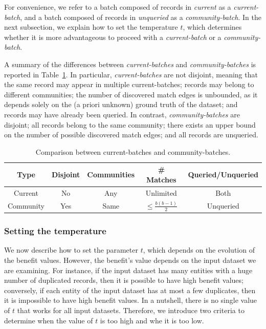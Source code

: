\documentclass[sigconf, nonacm]{acmart}
\newcommand{\window}{b}
\begin{document}
For convenience, we refer to a batch composed of records in \emph{current} as a \emph{current-batch}, and a batch composed of records in \emph{unqueried} as a \emph{community-batch}. In the next subsection, we explain how to set the temperature $t$, which determines whether it is more advantageous to proceed with a \emph{current-batch} or a \emph{community-batch}.

A summary of the differences between \emph{current-batches} and \emph{community}\emph{-batches} is reported in Table~\ref{tab:batch_comparison}. 
In particular, \emph{current-batches} are not disjoint, meaning that the same record may appear in multiple current-batches; records may belong to different communities; the number of discovered match edges is unbounded, as it depends solely on the (a priori unknown) ground truth of the dataset; and records may have already been queried.
In contrast, \emph{community-batches} are disjoint; all records belong to the same community; there exists an upper bound on the number of possible discovered match edges; and all records are unqueried.



\begin{table}[h]
    \small 
    \setlength{\tabcolsep}{3pt} 
    \centering
    \renewcommand{\arraystretch}{1.5}
    \begin{tabular}{|c|c|c|c|c|}
        \hline
        Type & Disjoint & Communities & \# Matches  & Queried/Unqueried\\ 
        \hline
        Current & No & Any & Unlimited & Both\\ 
        \hline
        Community & Yes & Same & $\leq \frac{\window(\window-1)}{2}$ & Unqueried\\ 
        \hline
    \end{tabular}
    \caption{Comparison between current-batches and community-batches.}
    \label{tab:batch_comparison}
\end{table}




\subsubsection{Setting the temperature}\label{subsub:temperature}

We now describe how to set the parameter $t$, which depends on the evolution of the benefit values. However, the benefit's value depends on the input dataset we are examining. 
For instance, if the input dataset has many entities with a huge number of duplicated records, then it is possible to have high benefit values; conversely, if each entity of the input dataset has at most a few duplicates, then it is impossible to have high benefit values. In a nutshell, there is no single value of $t$ that works for all input datasets. 
Therefore, we introduce two criteria to determine when the value of $t$ is too high and whe it is too low.
\end{document}
